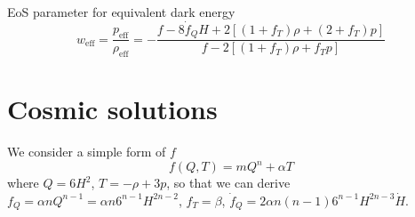 \documentclass[manuscript]{aastex631}
\begin{document}
EoS parameter for equivalent dark energy
\begin{equation}
w_{\text{eff}}=\frac{p_{\text{eff}}}{\rho_{\text{eff}}} = -\frac{f - 8\dot{f}_Q H + 2[(1 + f_T)\rho + (2 + f_T)p]}{f - 2[(1 + f_T)\rho + f_T p]}
\end{equation}




\section{Cosmic solutions}

We consider a simple form of $f$ 
\begin{equation}
    f(Q,T)=m Q^n+\alpha T
\end{equation}
where $Q=6H^2$, $T=-\rho+3p$, so that we can derive $f_Q=\alpha n Q^{n-1}=\alpha n 6^{n-1}H^{2n-2}$, $f_T=\beta$, $\dot{f}_Q=2\alpha n(n-1)6^{n-1}H^{2n-3}\dot{H}$.
\end{document}
